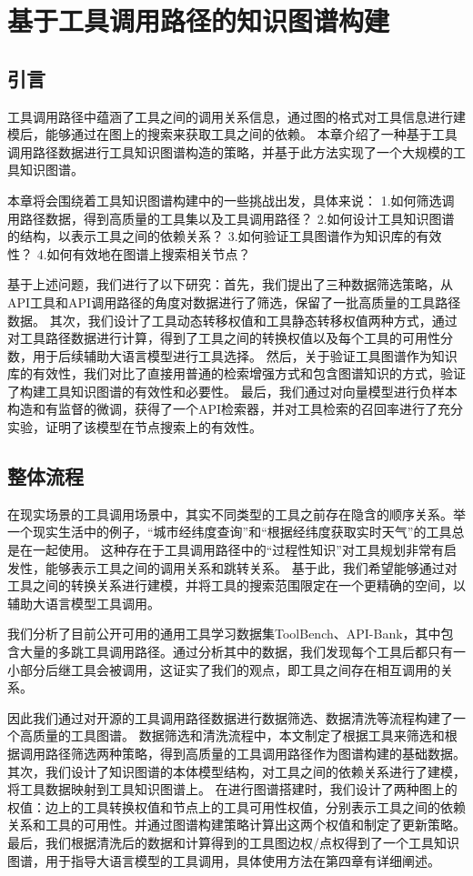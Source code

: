 \chapter{基于工具调用路径的知识图谱构建}

\section{引言}

工具调用路径中蕴涵了工具之间的调用关系信息，通过图的格式对工具信息进行建模后，能够通过在图上的搜索来获取工具之间的依赖。
本章介绍了一种基于工具调用路径数据进行工具知识图谱构造的策略，并基于此方法实现了一个大规模的工具知识图谱。

本章将会围绕着工具知识图谱构建中的一些挑战出发，具体来说：
1.如何筛选调用路径数据，得到高质量的工具集以及工具调用路径？
2.如何设计工具知识图谱的结构，以表示工具之间的依赖关系？
3.如何验证工具图谱作为知识库的有效性？
4.如何有效地在图谱上搜索相关节点？

基于上述问题，我们进行了以下研究：首先，我们提出了三种数据筛选策略，从API工具和API调用路径的角度对数据进行了筛选，保留了一批高质量的工具路径数据。
其次，我们设计了工具动态转移权值和工具静态转移权值两种方式，通过对工具路径数据进行计算，得到了工具之间的转换权值以及每个工具的可用性分数，用于后续辅助大语言模型进行工具选择。
然后，关于验证工具图谱作为知识库的有效性，我们对比了直接用普通的检索增强方式和包含图谱知识的方式，验证了构建工具知识图谱的有效性和必要性。
最后，我们通过对向量模型进行负样本构造和有监督的微调，获得了一个API检索器，并对工具检索的召回率进行了充分实验，证明了该模型在节点搜索上的有效性。

\section{整体流程}

在现实场景的工具调用场景中，其实不同类型的工具之前存在隐含的顺序关系。举一个现实生活中的例子，“城市经纬度查询”和“根据经纬度获取实时天气”的工具总是在一起使用。
这种存在于工具调用路径中的“过程性知识”对工具规划非常有启发性，能够表示工具之间的调用关系和跳转关系。
基于此，我们希望能够通过对工具之间的转换关系进行建模，并将工具的搜索范围限定在一个更精确的空间，以辅助大语言模型工具调用。

我们分析了目前公开可用的通用工具学习数据集ToolBench、API-Bank，其中包含大量的多跳工具调用路径。通过分析其中的数据，我们发现每个工具后都只有一小部分后继工具会被调用，这证实了我们的观点，即工具之间存在相互调用的关系。

因此我们通过对开源的工具调用路径数据进行数据筛选、数据清洗等流程构建了一个高质量的工具图谱。
数据筛选和清洗流程中，本文制定了根据工具来筛选和根据调用路径筛选两种策略，得到高质量的工具调用路径作为图谱构建的基础数据。
其次，我们设计了知识图谱的本体模型结构，对工具之间的依赖关系进行了建模，将工具数据映射到工具知识图谱上。
在进行图谱搭建时，我们设计了两种图上的权值：边上的工具转换权值和节点上的工具可用性权值，分别表示工具之间的依赖关系和工具的可用性。并通过图谱构建策略计算出这两个权值和制定了更新策略。
最后，我们根据清洗后的数据和计算得到的工具图边权/点权得到了一个工具知识图谱，用于指导大语言模型的工具调用，具体使用方法在第四章有详细阐述。

